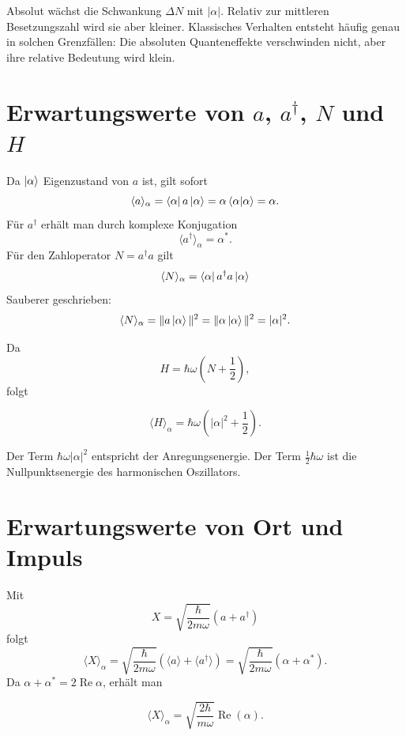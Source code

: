 \begin{notebox}
Absolut wächst die Schwankung \(\Delta N\) mit \(|\alpha|\). Relativ zur mittleren Besetzungszahl wird sie aber kleiner. Klassisches Verhalten entsteht häufig genau in solchen Grenzfällen: Die absoluten Quanteneffekte verschwinden nicht, aber ihre relative Bedeutung wird klein.
\end{notebox}

\section{Erwartungswerte von \texorpdfstring{\(a\), \(a^\dagger\), \(N\) und \(H\)}{a, a†, N und H}}

Da \(\left|\alpha\right\rangle\) Eigenzustand von \(a\) ist, gilt sofort
\[
    \langle a\rangle_\alpha
    =\left\langle\alpha\right|a\left|\alpha\right\rangle
    =\alpha\left\langle\alpha\middle|\alpha\right\rangle
    =\alpha.
\]
Für \(a^\dagger\) erhält man durch komplexe Konjugation
\[
    \langle a^\dagger\rangle_\alpha=\alpha^*.
\]
Für den Zahloperator \(N=a^\dagger a\) gilt
\[
    \langle N\rangle_\alpha
    =\left\langle\alpha\right|a^\dagger a\left|\alpha\right\rangle
\]
Sauberer geschrieben:
\[
    \langle N\rangle_\alpha
    =\|a\left|\alpha\right\rangle\|^2
    =\|\alpha\left|\alpha\right\rangle\|^2
    =|\alpha|^2.
\]

Da
\[
    H=\hbar\omega\left(N+\frac12\right),
\]
folgt
\begin{formulabox}
\[
    \langle H\rangle_\alpha
    =\hbar\omega\left(|\alpha|^2+\frac12\right).
\]
\end{formulabox}

\begin{notebox}
Der Term \(\hbar\omega|\alpha|^2\) entspricht der Anregungsenergie. Der Term \(\frac12\hbar\omega\) ist die Nullpunktsenergie des harmonischen Oszillators.
\end{notebox}

\section{Erwartungswerte von Ort und Impuls}

Mit
\[
    X=\sqrt{\frac{\hbar}{2m\omega}}(a+a^\dagger)
\]
folgt
\[
    \langle X\rangle_\alpha
    =\sqrt{\frac{\hbar}{2m\omega}}(\langle a\rangle+\langle a^\dagger\rangle)
    =\sqrt{\frac{\hbar}{2m\omega}}(\alpha+\alpha^*).
\]
Da \(\alpha+\alpha^*=2\operatorname{Re}\alpha\), erhält man
\begin{formulabox}
\[
    \langle X\rangle_\alpha
    =\sqrt{\frac{2\hbar}{m\omega}}\operatorname{Re}(\alpha).
\]
\end{formulabox}

